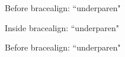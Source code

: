 \documentclass{article}
\begin{document}
\begin{dispExample}
  Before \textsf{bracealign}:\newline
  ``\expandafter\meaning\csname underparen\endcsname"
  \par\bigskip
  \begin{bracealign}
    Inside \textsf{bracealign}:\newline
    ``\expandafter\meaning\csname underparen\endcsname"
  \end{bracealign}
  \par\bigskip
  Before \textsf{bracealign}:\newline
  ``\expandafter\meaning\csname underparen\endcsname"
\end{dispExample}
\end{document}
